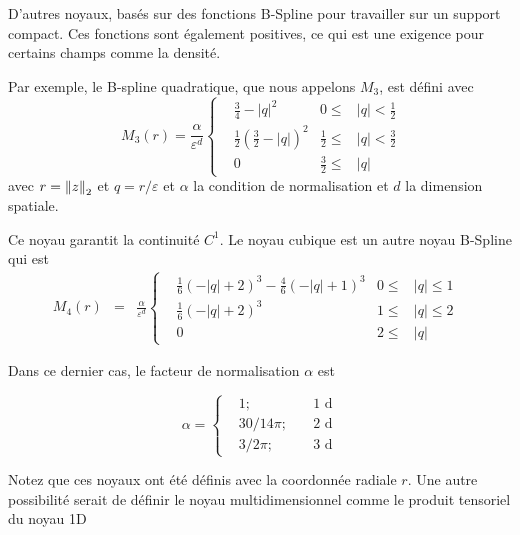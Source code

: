 D'autres noyaux, basés sur des fonctions B-Spline pour travailler sur un support compact. Ces fonctions sont également positives, ce qui est une exigence pour certains champs comme la densité.

Par exemple, le B-spline quadratique, que nous appelons $M_3$, est défini avec
\begin{equation}~\label{quadratic_kernel}
    M_3(r) = \frac{\alpha}{\varepsilon^d}\left\{ \begin{aligned}
         & \frac{3}{4} - |q|^2                            & 0 \leq           & |q| < \frac{1}{2} \\
         & \frac{1}{2} {\left(\frac{3}{2} - |q|\right)}^2 & \frac{1}{2} \leq & |q| < \frac{3}{2} \\
         & 0                                              & \frac{3}{2} \leq & |q|
    \end{aligned}
    \right.
\end{equation}avec $r = \left\lVert z \right\rVert_2 $ et $q = r / \varepsilon$ et $\alpha$ la condition de normalisation et $d$ la dimension spatiale.

Ce noyau garantit la continuité $C^1$.
Le noyau cubique est un autre noyau B-Spline qui est
\begin{eqnarray}~\label{cubic_kernel}
    M_4(r) &=&  \frac{\alpha}{\varepsilon^d} \left\{ \begin{aligned}
         & \frac{1}{6}{(-|q|+2)}^3 - \frac{4}{6}{(-|q|+1)}^3 & 0 \leq      & |q| \leq  1 & \\
         & \frac{1}{6}{(- |q|+2)}^3                          & 1      \leq & |q| \leq 2  & \\
         & 0                                                 & 2 \leq      & |q|
    \end{aligned}
    \right.
\end{eqnarray}

Dans ce dernier cas, le facteur de normalisation $\alpha$ est

\begin{equation*}
    \alpha = \left\{ \begin{aligned}
         & 1;    \quad      & 1\text{ d} \\
         & 30/14 \pi; \quad & 2\text{ d} \\
         & 3/ 2\pi; \quad   & 3\text{ d}
    \end{aligned}
    \right.
\end{equation*}

Notez que ces noyaux ont été définis avec la coordonnée radiale $r$. Une autre possibilité serait de définir le noyau multidimensionnel comme le produit tensoriel du noyau 1D

